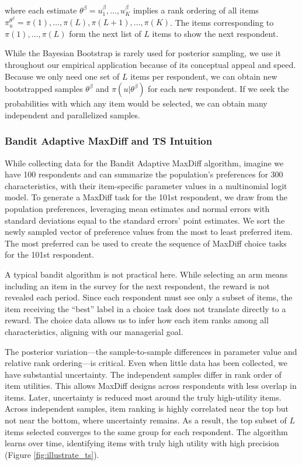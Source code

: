 \documentclass[a4paper,11pt]{article}
\newcommand{\ts}{\textbf{TS} }
\newcommand{\numperset}{L}
\begin{document}
where each estimate $\theta^\beta = u_1^\beta, \ldots, u_K^\beta$ implies a rank ordering of all items $\pi_{u}^{\theta^\beta} = \pi(1),\ldots,\pi(\numperset),\pi(\numperset+1),\ldots,\pi(K)$. The items corresponding to $\pi(1),\ldots,\pi(\numperset)$ form the next list of $\numperset$ items to show the next respondent. 

While the Bayesian Bootstrap is rarely used for posterior sampling, we use it throughout our empirical application because of its conceptual appeal and speed. Because we only need one set of $\numperset$ items per respondent, we can obtain new bootstrapped samples $\theta^{\beta}$ and $\pi(u|\theta^\beta)$ for each new respondent. If we seek the probabilities with which any item would be selected, we can obtain many independent and parallelized samples. 

\subsubsection{Bandit Adaptive MaxDiff and \ts Intuition }

While collecting data for the Bandit Adaptive MaxDiff algorithm, imagine we have 100 respondents and can summarize the population's preferences for 300 characteristics, with their item-specific parameter values in a multinomial logit model. To generate a MaxDiff task for the 101st respondent, we draw from the population preferences, leveraging mean estimates and normal errors with standard deviations equal to the standard errors' point estimates. We sort the newly sampled vector of preference values from the most to least preferred item. The most preferred can be used to create the sequence of MaxDiff choice tasks for the 101st respondent.

A typical bandit algorithm is not practical here. While selecting an arm means including an item in the survey for the next respondent, the reward is not revealed each period. Since each respondent must see only a subset of items, the item receiving the ``best'' label in a choice task does not translate directly to a reward. The choice data allows us to infer how each item ranks among all characteristics, aligning with our managerial goal.

The posterior variation---the sample-to-sample differences in parameter value and relative rank ordering---is critical. Even when little data has been collected, we have substantial uncertainty. The independent samples differ in rank order of item utilities. This allows MaxDiff designs across respondents with less overlap in items. Later, uncertainty is reduced most around the truly high-utility items. Across independent samples, item ranking is highly correlated near the top but not near the bottom, where uncertainty remains. As a result, the top subset of $\numperset$ items selected converges to the same group for each respondent. The algorithm learns over time, identifying items with truly high utility with high precision (Figure \ref{fig:illustrate_ts}). 
\end{document}
